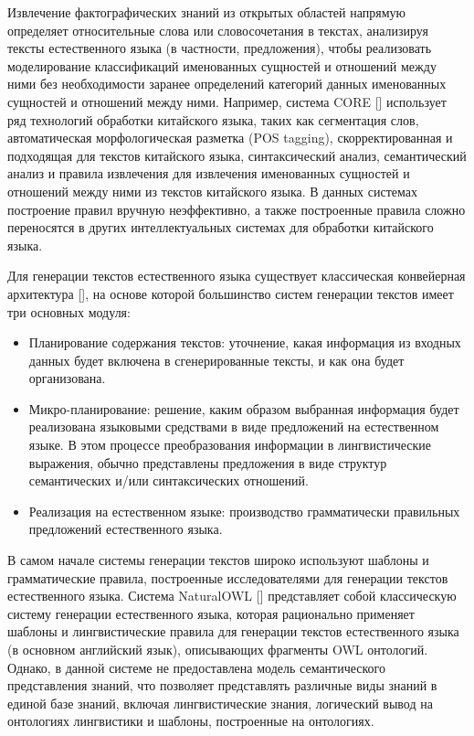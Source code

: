 Извлечение фактографических знаний из открытых областей напрямую определяет относительные слова или словосочетания в текстах, анализируя тексты естественного языка (в частности, предложения), чтобы реализовать моделирование классификаций именованных сущностей и отношений между ними без необходимости заранее определений категорий данных именованных сущностей и отношений между ними.  Например, система CORE [] использует ряд технологий обработки китайского языка, таких как сегментация слов, автоматическая морфологическая разметка (POS tagging), скорректированная и подходящая для текстов китайского языка, синтаксический анализ, семантический анализ и правила извлечения для извлечения именованных сущностей и отношений между ними из текстов китайского языка. В данных системах построение правил вручную неэффективно, а также построенные правила сложно переносятся в других интеллектуальных системах для обработки китайского языка.

Для генерации текстов естественного языка существует классическая конвейерная архитектура [], на основе которой большинство систем генерации текстов имеет три основных модуля:
\begin{itemize}
	\item Планирование содержания текстов: уточнение, какая информация из входных данных будет включена в сгенерированные тексты, и как она будет организована.
	\item Микро-планирование: решение, каким образом выбранная информация будет реализована языковыми средствами в виде предложений на естественном языке. В этом процессе преобразования информации в лингвистические выражения, обычно представлены предложения в виде структур семантических и/или синтаксических отношений.
	\item Реализация на естественном языке: производство грамматически правильных предложений естественного языка.
\end{itemize}

В самом начале системы генерации текстов широко используют шаблоны и грамматические правила, построенные исследователями для генерации текстов естественного языка. Система NaturalOWL [] представляет собой классическую систему генерации естественного языка, которая рационально применяет шаблоны и лингвистические правила для генерации текстов естественного языка (в основном английский язык), описывающих фрагменты OWL онтологий. Однако, в данной системе не предоставлена модель семантического представления знаний, что позволяет представлять различные виды знаний в единой базе знаний, включая лингвистические знания, логический вывод на онтологиях лингвистики и шаблоны, построенные на онтологиях. 

